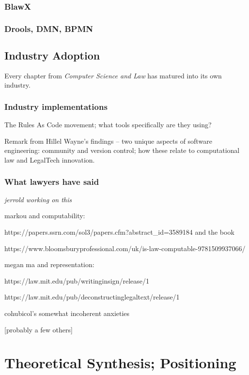 \documentclass{IOS-Book-Article}
\begin{document}
\subsubsection{BlawX}

\subsubsection{Drools, DMN, BPMN}

\subsection{Industry Adoption}

Every chapter from \textit{Computer Science and Law} has matured into its own industry.

\subsubsection{Industry implementations}

The Rules As Code movement; what tools specifically are they using?

Remark from Hillel Wayne's findings -- two unique aspects of software engineering: community and version control; how these relate to computational law and LegalTech innovation.

\subsubsection{What lawyers have said}
\textit{jerrold working on this}

markou and computability:

https://papers.ssrn.com/sol3/papers.cfm?abstract_id=3589184 and the book

https://www.bloomsburyprofessional.com/uk/is-law-computable-9781509937066/

megan ma and representation: 

https://law.mit.edu/pub/writinginsign/release/1

https://law.mit.edu/pub/deconstructinglegaltext/release/1

cohubicol's somewhat incoherent anxieties

[probably a few others]

\section{Theoretical Synthesis; Positioning}
\end{document}

